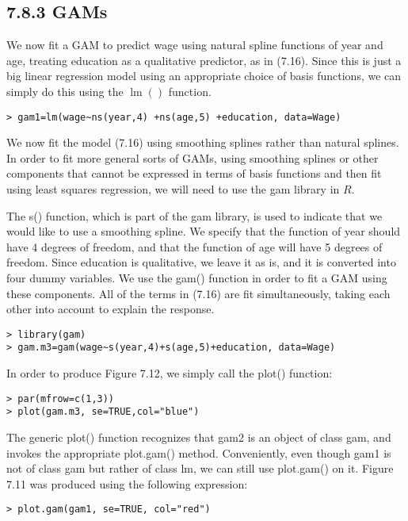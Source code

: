 \documentclass[10pt]{article}
\begin{document}
\subsection*{7.8.3 GAMs}
We now fit a GAM to predict wage using natural spline functions of year and age, treating education as a qualitative predictor, as in (7.16). Since this is just a big linear regression model using an appropriate choice of basis functions, we can simply do this using the $\operatorname{lm}()$ function.

\begin{verbatim}
> gam1=lm(wage~ns(year,4) +ns(age,5) +education, data=Wage)
\end{verbatim}

We now fit the model (7.16) using smoothing splines rather than natural splines. In order to fit more general sorts of GAMs, using smoothing splines or other components that cannot be expressed in terms of basis functions and then fit using least squares regression, we will need to use the gam library in $R$.

The s() function, which is part of the gam library, is used to indicate that we would like to use a smoothing spline. We specify that the function of year should have 4 degrees of freedom, and that the function of age will have 5 degrees of freedom. Since education is qualitative, we leave it as is, and it is converted into four dummy variables. We use the gam() function in order to fit a GAM using these components. All of the terms in (7.16) are fit simultaneously, taking each other into account to explain the response.

\begin{verbatim}
> library(gam)
> gam.m3=gam(wage~s(year,4)+s(age,5)+education, data=Wage)
\end{verbatim}

In order to produce Figure 7.12, we simply call the plot() function:

\begin{verbatim}
> par(mfrow=c(1,3))
> plot(gam.m3, se=TRUE,col="blue")
\end{verbatim}

The generic plot() function recognizes that gam2 is an object of class gam, and invokes the appropriate plot.gam() method. Conveniently, even though gam1 is not of class gam but rather of class lm, we can still use plot.gam() on it. Figure 7.11 was produced using the following expression:

\begin{verbatim}
> plot.gam(gam1, se=TRUE, col="red")
\end{verbatim}
\end{document}
